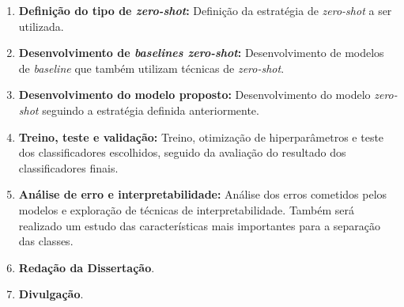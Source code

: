 \documentclass[
	12pt, oneside, a4paper, english, brazil
]{abntex2ppgsi}
\begin{document}
\begin{itemize}
\begin{enumerate}
        \item \textbf{Definição do tipo de {\em zero-shot}:} Definição da estratégia de {\em zero-shot} a ser utilizada.
    
        \item \textbf{Desenvolvimento de {\em baselines zero-shot}:} Desenvolvimento de modelos de {\em baseline} que também utilizam técnicas de {\em zero-shot}.
    
        \item \textbf{Desenvolvimento do modelo proposto:} Desenvolvimento do modelo {\em zero-shot} seguindo a estratégia definida anteriormente.
    
        \item \textbf{Treino, teste e validação:} Treino, otimização de hiperparâmetros e teste dos classificadores escolhidos, seguido da avaliação do resultado dos classificadores finais.
    
        \item \textbf{Análise de erro e interpretabilidade:} Análise dos erros cometidos pelos modelos e exploração de técnicas de interpretabilidade. Também será realizado um estudo das características mais importantes para a separação das classes.
        
        \item \textbf{Redação da Dissertação}. 
        
        \item \textbf{Divulgação}.
    \end{enumerate}
\end{itemize}
\end{document}

